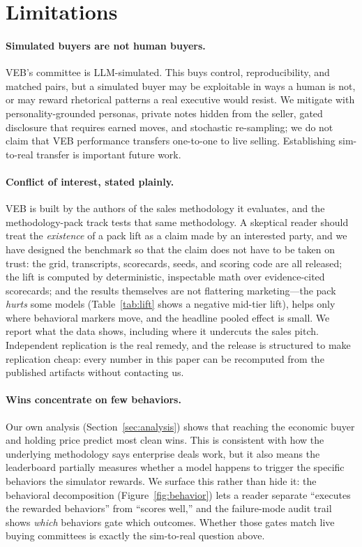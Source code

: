 \section{Limitations}
\label{sec:limitations}

\paragraph{Simulated buyers are not human buyers.} VEB's committee is
LLM-simulated. This buys control, reproducibility, and matched pairs, but a
simulated buyer may be exploitable in ways a human is not, or may reward
rhetorical patterns a real executive would resist. We mitigate with
personality-grounded personas, private notes hidden from the seller, gated
disclosure that requires earned moves, and stochastic re-sampling; we do not claim
that VEB performance transfers one-to-one to live selling. Establishing
sim-to-real transfer is important future work.

\paragraph{Conflict of interest, stated plainly.} VEB is built by the authors of
the sales methodology it evaluates, and the methodology-pack track tests that same
methodology. A skeptical reader should treat the \emph{existence} of a pack lift as
a claim made by an interested party, and we have designed the benchmark so that the
claim does not have to be taken on trust: the grid, transcripts, scorecards, seeds,
and scoring code are all released; the lift is computed by deterministic,
inspectable math over evidence-cited scorecards; and the results themselves are not
flattering marketing---the pack \emph{hurts} some models (Table~\ref{tab:lift}
shows a negative mid-tier lift), helps only where behavioral markers move, and the
headline pooled effect is small. We report what the data shows, including where it
undercuts the sales pitch. Independent replication is the real remedy, and the
release is structured to make replication cheap: every number in this paper can be
recomputed from the published artifacts without contacting us.

\paragraph{Wins concentrate on few behaviors.} Our own analysis
(Section~\ref{sec:analysis}) shows that reaching the economic buyer and holding
price predict most clean wins. This is consistent with how the underlying
methodology says enterprise deals work, but it also means the leaderboard partially
measures whether a model happens to trigger the specific behaviors the simulator
rewards. We surface this rather than hide it: the behavioral decomposition
(Figure~\ref{fig:behavior}) lets a reader separate ``executes the rewarded
behaviors'' from ``scores well,'' and the failure-mode audit trail shows
\emph{which} behaviors gate which outcomes. Whether those gates match live buying
committees is exactly the sim-to-real question above.

